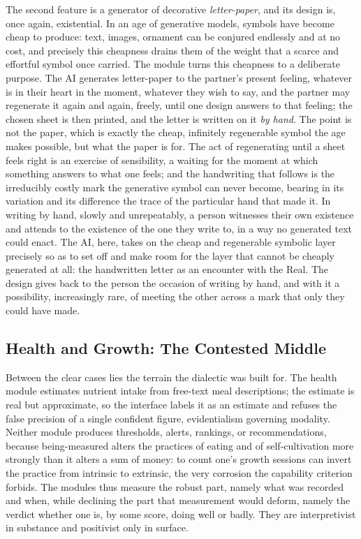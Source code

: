 The second feature is a generator of decorative \emph{letter-paper}, and its design is, once again, existential. In an age of generative models, symbols have become cheap to produce: text, images, ornament can be conjured endlessly and at no cost, and precisely this cheapness drains them of the weight that a scarce and effortful symbol once carried. The module turns this cheapness to a deliberate purpose. The AI generates letter-paper to the partner's present feeling, whatever is in their heart in the moment, whatever they wish to say, and the partner may regenerate it again and again, freely, until one design answers to that feeling; the chosen sheet is then printed, and the letter is written on it \emph{by hand}. The point is not the paper, which is exactly the cheap, infinitely regenerable symbol the age makes possible, but what the paper is for. The act of regenerating until a sheet feels right is an exercise of sensibility, a waiting for the moment at which something answers to what one feels; and the handwriting that follows is the irreducibly costly mark the generative symbol can never become, bearing in its variation and its difference the trace of the particular hand that made it. In writing by hand, slowly and unrepeatably, a person witnesses their own existence and attends to the existence of the one they write to, in a way no generated text could enact. The AI, here, takes on the cheap and regenerable symbolic layer precisely so as to set off and make room for the layer that cannot be cheaply generated at all: the handwritten letter as an encounter with the Real. The design gives back to the person the occasion of writing by hand, and with it a possibility, increasingly rare, of meeting the other across a mark that only they could have made.

\subsection{Health and Growth: The Contested Middle}

Between the clear cases lies the terrain the dialectic was built for. The health module estimates nutrient intake from free-text meal descriptions; the estimate is real but approximate, so the interface labels it as an estimate and refuses the false precision of a single confident figure, evidentialism governing modality. Neither module produces thresholds, alerts, rankings, or recommendations, because being-measured alters the practices of eating and of self-cultivation more strongly than it alters a sum of money: to count one's growth sessions can invert the practice from intrinsic to extrinsic, the very corrosion the capability criterion forbids. The modules thus measure the robust part, namely what was recorded and when, while declining the part that measurement would deform, namely the verdict whether one is, by some score, doing well or badly. They are interpretivist in substance and positivist only in surface.

